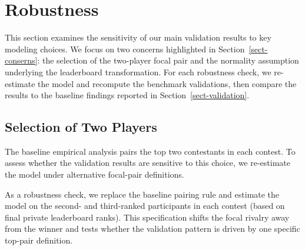 \documentclass[mnsc]{informs3}
\begin{document}
\section{Robustness}

This section examines the sensitivity of our main validation results to key modeling choices.
We focus on two concerns highlighted in Section~\ref{sect-conserns}: the selection of the two-player focal pair and the normality assumption underlying the leaderboard transformation. For each robustness check, we re-estimate the model and recompute the benchmark validations, then compare the results to the baseline findings reported in Section~\ref{sect-validation}.

\subsection{Selection of Two Players}\label{sect-robust-2players}

The baseline empirical analysis pairs the top two contestants in each contest.
To assess whether the validation results are sensitive to this choice, we re-estimate the model under alternative focal-pair definitions.

As a robustness check, we replace the baseline pairing rule and estimate the model on the second- and third-ranked participants in each contest (based on final private leaderboard ranks).
This specification shifts the focal rivalry away from the winner and tests whether the validation pattern is driven by one specific top-pair definition.
\end{document}

